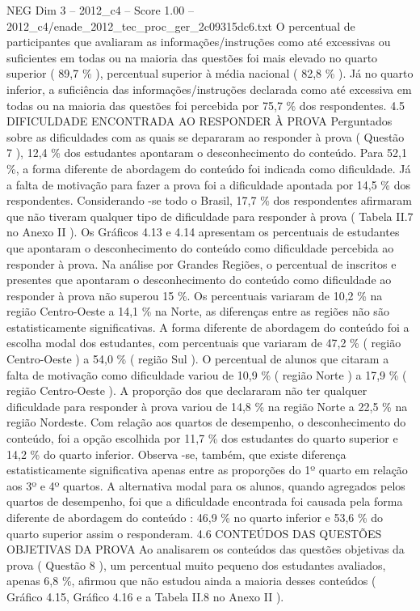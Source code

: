 \begin{textsample}{NEG Dim 3 – 2012\_c4 – Score 1.00 – 2012\_c4/enade\_2012\_tec\_proc\_ger\_2c09315dc6.txt}
O percentual de participantes que avaliaram as informações/instruções como até excessivas ou suficientes em todas ou na maioria das questões foi mais elevado no quarto superior ( 89,7 \% ), percentual superior à média nacional ( 82,8 \% ).
Já no quarto inferior, a suficiência das informações/instruções declarada como até excessiva em todas ou na maioria das questões foi percebida por 75,7 \% dos respondentes. 4.5 DIFICULDADE ENCONTRADA AO RESPONDER À PROVA Perguntados sobre as dificuldades com as quais se depararam ao responder à prova ( Questão 7 ), 12,4 \% dos estudantes apontaram o desconhecimento do conteúdo.
Para 52,1 \%, a forma diferente de abordagem do conteúdo foi indicada como dificuldade.
Já a falta de motivação para fazer a prova foi a dificuldade apontada por 14,5 \% dos respondentes.
Considerando -se todo o Brasil, 17,7 \% dos respondentes afirmaram que não tiveram qualquer tipo de dificuldade para responder à prova ( Tabela II.7 no Anexo II ).
Os Gráficos 4.13 e 4.14 apresentam os percentuais de estudantes que apontaram o desconhecimento do conteúdo como dificuldade percebida ao responder à prova.
Na análise por Grandes Regiões, o percentual de inscritos e presentes que apontaram o desconhecimento do conteúdo como dificuldade ao responder à prova não superou 15 \%.
Os percentuais variaram de 10,2 \% na região Centro-Oeste a 14,1 \% na Norte, as diferenças entre as regiões não são estatisticamente significativas.
A forma diferente de abordagem do conteúdo foi a escolha modal dos estudantes, com percentuais que variaram de 47,2 \% ( região Centro-Oeste ) a 54,0 \% ( região Sul ).
O percentual de alunos que citaram a falta de motivação como dificuldade variou de 10,9 \% ( região Norte ) a 17,9 \% ( região Centro-Oeste ).
A proporção dos que declararam não ter qualquer dificuldade para responder à prova variou de 14,8 \% na região Norte a 22,5 \% na região Nordeste.
Com relação aos quartos de desempenho, o desconhecimento do conteúdo, foi a opção escolhida por 11,7 \% dos estudantes do quarto superior e 14,2 \% do quarto inferior.
Observa -se, também, que existe diferença estatisticamente significativa apenas entre as proporções do 1º quarto em relação aos 3º e 4º quartos.
A alternativa modal para os alunos, quando agregados pelos quartos de desempenho, foi que a dificuldade encontrada foi causada pela forma diferente de abordagem do conteúdo : 46,9 \% no quarto inferior e 53,6 \% do quarto superior assim o responderam. 4.6 CONTEÚDOS DAS QUESTÕES OBJETIVAS DA PROVA Ao analisarem os conteúdos das questões objetivas da prova ( Questão 8 ), um percentual muito pequeno dos estudantes avaliados, apenas 6,8 \%, afirmou que não estudou ainda a maioria desses conteúdos ( Gráfico 4.15, Gráfico 4.16 e a Tabela II.8 no Anexo II ).

\end{textsample}
